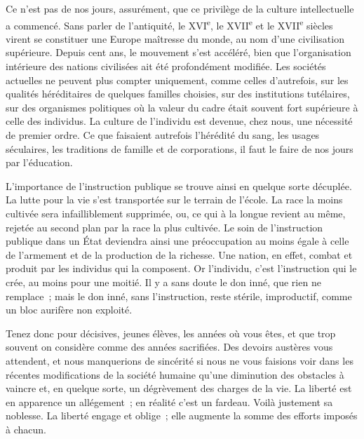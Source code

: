 \documentclass[french,twoside]{book} %
\newcommand\orgName[1]{#1}
\begin{document}
Ce n’est pas de nos jours, assurément, que ce privilège de la culture intellectuelle a commencé. Sans parler de l’antiquité, le XVI\textsuperscript{e}, le XVII\textsuperscript{e} et le XVII\textsuperscript{e} siècles virent se constituer une {\orgName Europe} maîtresse du monde, au nom d’une civilisation supérieure. Depuis cent ans, le mouvement s’est accéléré, bien que l’organisation intérieure des nations civilisées ait été profondément modifiée. Les sociétés actuelles ne peuvent plus compter uniquement, comme celles d’autrefois, sur les qualités héréditaires de quelques familles choisies, sur des institutions tutélaires, sur des organismes politiques où la valeur du cadre était souvent fort supérieure à celle des individus. La culture de l’individu est devenue, chez nous, une nécessité de premier ordre. Ce que faisaient autrefois l’hérédité du sang, les usages séculaires, les traditions de famille et de corporations, il faut le faire de nos jours par l’éducation.\par
L’importance de l’instruction publique se trouve ainsi en quelque sorte décuplée. La lutte pour la vie s’est transportée sur le terrain de l’école. La race la moins cultivée sera infailliblement supprimée, ou, ce qui à la longue revient au même, rejetée au second plan par la race la plus cultivée. Le soin de l’instruction publique dans un État deviendra ainsi une préoccupation au moins égale à celle de l’armement et de la production de la richesse. Une nation, en effet, combat et produit par les individus qui la composent. Or l’individu, c’est l’instruction qui le crée, au moins pour une moitié. Il y a sans doute le don inné, que rien ne remplace ; mais le don inné, sans l’instruction, reste stérile, improductif, comme un bloc aurifère non exploité.\par
Tenez donc pour décisives, jeunes élèves, les années où vous êtes, et que trop souvent on considère comme des années sacrifiées. Des devoirs austères vous attendent, et nous manquerions de sincérité si nous ne vous faisions voir dans les récentes modifications de la société humaine qu’une diminution des obstacles à vaincre et, en quelque sorte, un dégrèvement des charges de la vie. La liberté est en apparence un allégement ; en réalité c’est un fardeau. Voilà justement sa noblesse. La liberté engage et oblige ; elle augmente la somme des efforts imposés à chacun.\par
\end{document}

